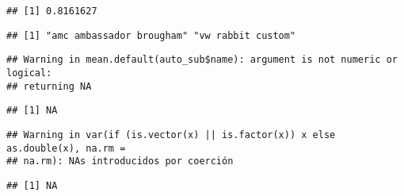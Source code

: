 \documentclass[
]{article}
\newenvironment{Shaded}{\begin{snugshade}}{\end{snugshade}}
\newcommand{\FunctionTok}[1]{\textcolor[rgb]{0.13,0.29,0.53}{\textbf{#1}}}
\newcommand{\NormalTok}[1]{#1}
\newcommand{\SpecialCharTok}[1]{\textcolor[rgb]{0.81,0.36,0.00}{\textbf{#1}}}
\begin{document}
\begin{Shaded}
\end{Shaded}

\begin{verbatim}
## [1] 0.8161627
\end{verbatim}

\begin{Shaded}
\end{Shaded}

\begin{verbatim}
## [1] "amc ambassador brougham" "vw rabbit custom"
\end{verbatim}

\begin{Shaded}
\end{Shaded}

\begin{verbatim}
## Warning in mean.default(auto_sub$name): argument is not numeric or logical:
## returning NA
\end{verbatim}

\begin{verbatim}
## [1] NA
\end{verbatim}

\begin{Shaded}
\end{Shaded}

\begin{verbatim}
## Warning in var(if (is.vector(x) || is.factor(x)) x else as.double(x), na.rm =
## na.rm): NAs introducidos por coerción
\end{verbatim}

\begin{verbatim}
## [1] NA
\end{verbatim}
\end{document}
